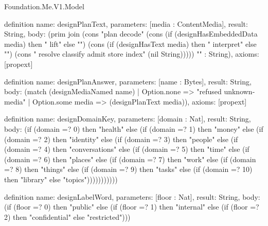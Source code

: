 \begin{lexlean}{Foundation.Me.V1.Model}
\begin{semanticmodule}
definition{
  name: designPlanText,
  parameters: [media : ContentMedia],
  result: String,
  body: (prim join (cons "plan decode" (cons (if (designHasEmbeddedData media) then " lift" else "") (cons (if (designHasText media) then " interpret" else "") (cons " resolve classify admit store index" (nil String))))) "" : String),
  axioms: [propext]
}

definition{
  name: designPlanAnswer,
  parameters: [name : Bytes],
  result: String,
  body: (match (designMediaNamed name)
    | Option.none => "refused unknown-media"
    | Option.some media => (designPlanText media)),
  axioms: [propext]
}

definition{
  name: designDomainKey,
  parameters: [domain : Nat],
  result: String,
  body: (if (domain =? 0) then "health" else (if (domain =? 1) then "money" else (if (domain =? 2) then "identity" else (if (domain =? 3) then "people" else (if (domain =? 4) then "conversations" else (if (domain =? 5) then "time" else (if (domain =? 6) then "places" else (if (domain =? 7) then "work" else (if (domain =? 8) then "things" else (if (domain =? 9) then "tasks" else (if (domain =? 10) then "library" else "topics")))))))))))
}

definition{
  name: designLabelWord,
  parameters: [floor : Nat],
  result: String,
  body: (if (floor =? 0) then "public" else (if (floor =? 1) then "internal" else (if (floor =? 2) then "confidential" else "restricted")))
}


\end{semanticmodule}
\end{lexlean}
